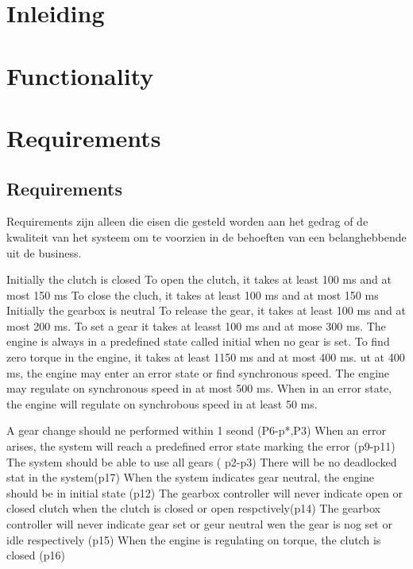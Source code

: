 \section{Inleiding}

\section{Functionality}

\section{Requirements}

\subsection{Requirements}
Requirements zijn alleen die eisen die gesteld worden aan het gedrag of de kwaliteit van het systeem om te voorzien in de behoeften van een belanghebbende uit de business.



Initially the clutch is closed
To open the clutch, it takes at least 100 ms and at most 150 ms
To close the cluch, it takes at least 100 ms and at most 150 ms
Initially the gearbox is neutral
To release the gear, it takes at least 100 ms and at most 200 ms.
To set a gear it takes at leasst 100 ms and at mose 300 ms.
The engine is always in a predefined state called initial when no gear is set.
To find zero torque in the engine, it takes at least 1150 ms and at most 400 ms. ut at 400 ms, the engine may enter an error state or find synchronous speed.
The  engine may regulate on synchronous speed in at most 500 ms.
When in an error state, the engine will regulate on synchrobous speed in at least 50 ms.


A gear change should ne performed within 1 seond (P6-p*,P3)
When an error arises, the system will reach a predefined error state marking the error (p9-p11)
The system should be able to use all gears ( p2-p3)
There will be no deadlocked stat in the system(p17)
When the system indicates gear neutral, the engine should  be in initial state (p12)
The gearbox controller will never indicate open or closed clutch when the clutch is closed or open respctively(p14)
The gearbox controller will never indicate gear set or geur neutral wen the gear is nog set or idle respectively (p15)
When the engine is regulating on torque, the clutch is closed (p16)



